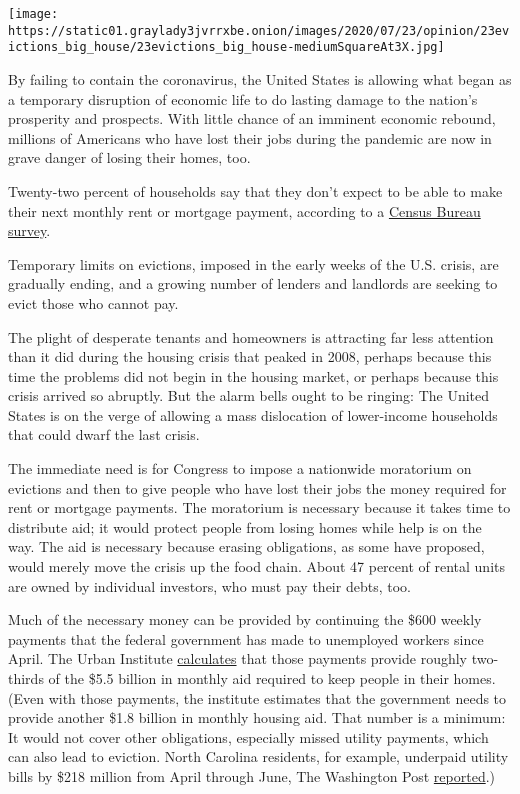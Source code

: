 \texttt{[image: https://static01.graylady3jvrrxbe.onion/images/2020/07/23/opinion/23evictions\_big\_house/23evictions\_big\_house-mediumSquareAt3X.jpg]}

By failing to contain the coronavirus, the United States is allowing
what began as a temporary disruption of economic life to do lasting
damage to the nation's prosperity and prospects. With little chance of
an imminent economic rebound, millions of Americans who have lost their
jobs during the pandemic are now in grave danger of losing their homes,
too.

Twenty-two percent of households say that they don't expect to be able
to make their next monthly rent or mortgage payment, according to a
\href{https://www.census.gov/householdpulsedata}{Census Bureau survey}.

Temporary limits on evictions, imposed in the early weeks of the U.S.
crisis, are gradually ending, and a growing number of lenders and
landlords are seeking to evict those who cannot pay.

The plight of desperate tenants and homeowners is attracting far less
attention than it did during the housing crisis that peaked in 2008,
perhaps because this time the problems did not begin in the housing
market, or perhaps because this crisis arrived so abruptly. But the
alarm bells ought to be ringing: The United States is on the verge of
allowing a mass dislocation of lower-income households that could dwarf
the last crisis.

The immediate need is for Congress to impose a nationwide moratorium on
evictions and then to give people who have lost their jobs the money
required for rent or mortgage payments. The moratorium is necessary
because it takes time to distribute aid; it would protect people from
losing homes while help is on the way. The aid is necessary because
erasing obligations, as some have proposed, would merely move the crisis
up the food chain. About 47 percent of rental units are owned by
individual investors, who must pay their debts, too.

Much of the necessary money can be provided by continuing the \$600
weekly payments that the federal government has made to unemployed
workers since April. The Urban Institute
\href{https://www.urban.org/research/publication/how-much-assistance-needed-support-renters-through-covid-19-crisis}{calculates}
that those payments provide roughly two-thirds of the \$5.5 billion in
monthly aid required to keep people in their homes. (Even with those
payments, the institute estimates that the government needs to provide
another \$1.8 billion in monthly housing aid. That number is a minimum:
It would not cover other obligations, especially missed utility
payments, which can also lead to eviction. North Carolina residents, for
example, underpaid utility bills by \$218 million from April through
June, The Washington Post
\href{https://www.washingtonpost.com/business/2020/07/23/north-carolina-utility-bills-coronavirus/?hpid=hp_hp-top-table-high_bailoutnorthcarolina-1215pm\%3Ahomepage\%2Fstory-ans}{reported}.)

